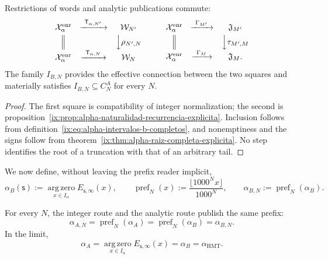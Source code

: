 \begin{proposition}
\label{ix:prop:alpha-cuadrados-compatibilidad}
Restrictions of words and analytic publications commute:
\[
\begin{array}{ccc}
 \mathcal X_\alpha^{\mathrm{enr}}&
 \xrightarrow{\ \mathsf T_{\alpha,N'}\ }&\mathcal W_{N'}\\[1mm]
 \Big\Vert&&\Big\downarrow\rho_{N',N}\\[1mm]
 \mathcal X_\alpha^{\mathrm{enr}}&
 \xrightarrow{\ \mathsf T_{\alpha,N}\ }&\mathcal W_N
\end{array}
\qquad
\begin{array}{ccc}
 \mathcal X_\alpha^{\mathrm{enr}}&
 \xrightarrow{\ \Gamma_{M'}\ }&\mathfrak J_{M'}\\[1mm]
 \Big\Vert&&\Big\downarrow\tau_{M',M}\\[1mm]
 \mathcal X_\alpha^{\mathrm{enr}}&
 \xrightarrow{\ \Gamma_M\ }&\mathfrak J_M .
\end{array}
\]
The family \(I_{B,N}\) provides the effective connection between the two
squares and materially satisfies
\(I_{B,N}\subseteq C_N^A\) for every \(N\).
\end{proposition}

\begin{proof}
The first square is compatibility of integer normalization; the second
is proposition~\ref{ix:prop:alpha-naturalidad-recurrencia-explicita}.
Inclusion follows from definition~\eqref{ix:eq:alpha-intervalos-b-completos},
and nonemptiness and the signs follow from
theorem~\ref{ix:thm:alpha-raiz-completa-explicita}. No step identifies the
root of a truncation with that of an arbitrary tail.
\end{proof}

We now define, without leaving the prefix reader implicit,
\begin{equation}
 \alpha_B(\mathsf s):=
 \operatorname*{arg\,zero}_{x\in I_\alpha}E_{\mathsf s,\infty}(x),
 \qquad
 \operatorname{pref}_N(x):=
 \frac{\lfloor1000^Nx\rfloor}{1000^N},
 \qquad
 \alpha_{B,N}:=\operatorname{pref}_N(\alpha_B).
 \label{ix:eq:alpha-definicion-b-y-prefijos-rev08}
\end{equation}

\begin{theorem}
\label{ix:prop:alpha-dos-limites}
For every \(N\), the integer route and the analytic route publish the same prefix:
\begingroup
\renewcommand{\theequation}{A7\(_0\)}
\begin{equation}
 \boxed{\alpha_{A,N}=\operatorname{pref}_N(\alpha_A)
 =\operatorname{pref}_N(\alpha_B)=\alpha_{B,N}.}
 \label{ix:eq:alpha-dos-vias-cada-nivel}
\end{equation}
\endgroup
In the limit,
\begingroup
\renewcommand{\theequation}{A8\(_0\)}
\begin{equation}
 \boxed{\alpha_A
 =\operatorname*{arg\,zero}_{x\in I_\alpha}
       E_{\mathsf s,\infty}(x)
 =\alpha_B=\alpha_{\mathrm{HMT}}.}
 \label{ix:eq:alpha-dos-vias-limite-coinductivo}
\end{equation}
\endgroup
\end{theorem}

